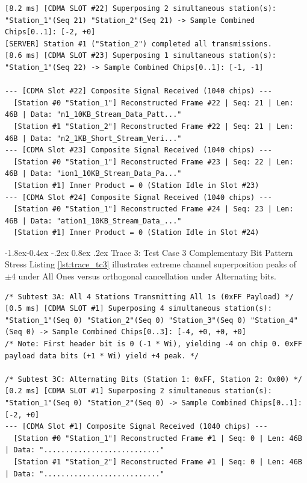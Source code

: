 \documentclass[11pt,a4paper]{article}
\makeatletter
\renewcommand\subsection{\@startsection{subsection}{2}{\z@}%
                                     {-1.8ex\@plus -0.4ex \@minus -.2ex}%
                                     {0.8ex \@plus .2ex}%
                                     {\normalfont\large\bfseries}}
\makeatother
\begin{document}
\begin{lstlisting}[style=tracestyle, caption={Live execution trace of Test Case 2: Transition from 2 active stations to dynamic silence.}, label={lst:trace_tc2}]
[8.2 ms] [CDMA SLOT #22] Superposing 2 simultaneous station(s): "Station_1"(Seq 21) "Station_2"(Seq 21) -> Sample Combined Chips[0..1]: [-2, +0]
[SERVER] Station #1 ("Station_2") completed all transmissions.
[8.6 ms] [CDMA SLOT #23] Superposing 1 simultaneous station(s): "Station_1"(Seq 22) -> Sample Combined Chips[0..1]: [-1, -1]

--- [CDMA Slot #22] Composite Signal Received (1040 chips) ---
  [Station #0 "Station_1"] Reconstructed Frame #22 | Seq: 21 | Len: 46B | Data: "n1_10KB_Stream_Data_Patt..."
  [Station #1 "Station_2"] Reconstructed Frame #22 | Seq: 21 | Len: 46B | Data: "n2_1KB_Short_Stream_Veri..."
--- [CDMA Slot #23] Composite Signal Received (1040 chips) ---
  [Station #0 "Station_1"] Reconstructed Frame #23 | Seq: 22 | Len: 46B | Data: "ion1_10KB_Stream_Data_Pa..."
  [Station #1] Inner Product = 0 (Station Idle in Slot #23)
--- [CDMA Slot #24] Composite Signal Received (1040 chips) ---
  [Station #0 "Station_1"] Reconstructed Frame #24 | Seq: 23 | Len: 46B | Data: "ation1_10KB_Stream_Data_..."
  [Station #1] Inner Product = 0 (Station Idle in Slot #24)
\end{lstlisting}

\subsection{Trace 3: Test Case 3 Complementary Bit Pattern Stress}
Listing \ref{lst:trace_tc3} illustrates extreme channel superposition peaks of $\pm 4$ under All Ones versus orthogonal cancellation under Alternating bits.

\begin{lstlisting}[style=tracestyle, caption={Live execution trace of Test Case 3: Complementary bit pattern stress.}, label={lst:trace_tc3}]
/* Subtest 3A: All 4 Stations Transmitting All 1s (0xFF Payload) */
[0.5 ms] [CDMA SLOT #1] Superposing 4 simultaneous station(s): "Station_1"(Seq 0) "Station_2"(Seq 0) "Station_3"(Seq 0) "Station_4"(Seq 0) -> Sample Combined Chips[0..3]: [-4, +0, +0, +0]
/* Note: First header bit is 0 (-1 * Wi), yielding -4 on chip 0. 0xFF payload data bits (+1 * Wi) yield +4 peak. */

/* Subtest 3C: Alternating Bits (Station 1: 0xFF, Station 2: 0x00) */
[0.2 ms] [CDMA SLOT #1] Superposing 2 simultaneous station(s): "Station_1"(Seq 0) "Station_2"(Seq 0) -> Sample Combined Chips[0..1]: [-2, +0]
--- [CDMA Slot #1] Composite Signal Received (1040 chips) ---
  [Station #0 "Station_1"] Reconstructed Frame #1 | Seq: 0 | Len: 46B | Data: "..........................."
  [Station #1 "Station_2"] Reconstructed Frame #1 | Seq: 0 | Len: 46B | Data: "..........................."
\end{lstlisting}
\end{document}

